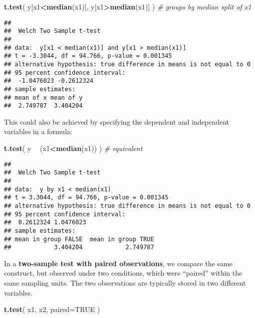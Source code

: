 \documentclass[]{book}
\newenvironment{Shaded}{\begin{snugshade}}{\end{snugshade}}
\newcommand{\CommentTok}[1]{\textcolor[rgb]{0.56,0.35,0.01}{\textit{#1}}}
\newcommand{\DataTypeTok}[1]{\textcolor[rgb]{0.13,0.29,0.53}{#1}}
\newcommand{\KeywordTok}[1]{\textcolor[rgb]{0.13,0.29,0.53}{\textbf{#1}}}
\newcommand{\NormalTok}[1]{#1}
\newcommand{\OperatorTok}[1]{\textcolor[rgb]{0.81,0.36,0.00}{\textbf{#1}}}
\newcommand{\OtherTok}[1]{\textcolor[rgb]{0.56,0.35,0.01}{#1}}
\newcommand{\StringTok}[1]{\textcolor[rgb]{0.31,0.60,0.02}{#1}}
\begin{document}
\begin{Shaded}
\begin{Highlighting}[]
\KeywordTok{t.test}\NormalTok{( y[x1}\OperatorTok{<}\KeywordTok{median}\NormalTok{(x1)], y[x1}\OperatorTok{>}\KeywordTok{median}\NormalTok{(x1)] ) }\CommentTok{# groups by median split of x1}
\end{Highlighting}
\end{Shaded}

\begin{verbatim}
## 
##  Welch Two Sample t-test
## 
## data:  y[x1 < median(x1)] and y[x1 > median(x1)]
## t = -3.3044, df = 94.766, p-value = 0.001345
## alternative hypothesis: true difference in means is not equal to 0
## 95 percent confidence interval:
##  -1.0476023 -0.2612324
## sample estimates:
## mean of x mean of y 
##  2.749787  3.404204
\end{verbatim}

This could also be achieved by specifying the dependent and
independent variables in a formula:

\begin{Shaded}
\begin{Highlighting}[]
\KeywordTok{t.test}\NormalTok{( y }\OperatorTok{~}\StringTok{ }\NormalTok{(x1}\OperatorTok{<}\KeywordTok{median}\NormalTok{(x1)) ) }\CommentTok{# equivalent}
\end{Highlighting}
\end{Shaded}

\begin{verbatim}
## 
##  Welch Two Sample t-test
## 
## data:  y by x1 < median(x1)
## t = 3.3044, df = 94.766, p-value = 0.001345
## alternative hypothesis: true difference in means is not equal to 0
## 95 percent confidence interval:
##  0.2612324 1.0476023
## sample estimates:
## mean in group FALSE  mean in group TRUE 
##            3.404204            2.749787
\end{verbatim}

In a \textbf{two-sample test with paired observations}, we compare the same construct, but observed under two conditions, which were ``paired'' within the same sampling units. The two observations are typically stored in two different variables.

\begin{Shaded}
\begin{Highlighting}[]
\KeywordTok{t.test}\NormalTok{( x1, x2, }\DataTypeTok{paired=}\OtherTok{TRUE}\NormalTok{ )}
\end{Highlighting}
\end{Shaded}
\end{document}
